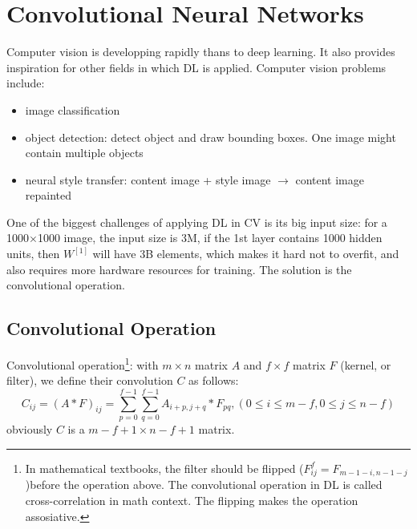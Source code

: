 \ifx\PREAMBLE\undefined


\fi
\chapter{Convolutional Neural Networks}
Computer vision is developping rapidly thans to deep learning. It also provides inspiration for other fields in which DL is applied. Computer vision problems include: 
\begin{itemize}
  \item image classification
  \item object detection: detect object and draw bounding boxes. One image might contain multiple objects
  \item neural style transfer: content image + style image $\rightarrow$ content image repainted
\end{itemize}
One of the biggest challenges of applying DL in CV is its big input size: for a 1000$\times$1000 image, the input size is 3M, if the 1st layer contains 1000 hidden units, then $W^{[1]}$ will have 3B elements, which makes it hard not to overfit, and also requires more hardware resources for training. The solution is the convolutional operation.
\section{Convolutional Operation}
Convolutional operation\footnote{In mathematical textbooks, the filter should be flipped ($F^f_{ij}=F_{m-1-i, n-1-j}$)before the operation above. The convolutional operation in DL is called cross-correlation in math context. The flipping makes the operation assosiative.}: with $m\times n$ matrix $A$ and $f\times f$ matrix $F$ (kernel, or filter), we define their convolution $C$ as follows:
    \[C_{ij}=\left(A*F\right)_{ij}=\displaystyle\sum_{p=0}^{f-1}\displaystyle\sum_{q=0}^{f-1}A_{i+p,j+q}*F_{pq}, \left(0\le i\le m-f, 0\le j\le n-f\right)\]
obviously $C$ is a $m-f+1\times n-f+1$ matrix.
